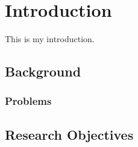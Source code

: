 \chapter{Introduction}\label{chap:intro}
\setcounter{section}{0}
\setcounter{subsection}{0}
\setcounter{page}{1}

This is my introduction.


\section{Background}

\blindtext

\subsection{Problems}

\blindtext

\section{Research Objectives}
\blindtext
